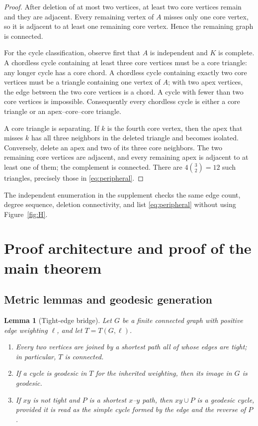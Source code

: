 \documentclass[11pt]{amsart}
\newtheorem{lemma}[theorem]{Lemma}
\theoremstyle{definition}
\begin{document}
\begin{proof}
After deletion of at most two vertices, at least two core vertices remain and they are adjacent.  Every remaining vertex of $A$ misses only one core vertex, so it is adjacent to at least one remaining core vertex.  Hence the remaining graph is connected.

For the cycle classification, observe first that $A$ is independent and $K$ is complete.  A chordless cycle containing at least three core vertices must be a core triangle: any longer cycle has a core chord.  A chordless cycle containing exactly two core vertices must be a triangle containing one vertex of $A$; with two apex vertices, the edge between the two core vertices is a chord.  A cycle with fewer than two core vertices is impossible.  Consequently every chordless cycle is either a core triangle or an apex--core--core triangle.

A core triangle is separating.  If $k$ is the fourth core vertex, then the apex that misses $k$ has all three neighbors in the deleted triangle and becomes isolated.  Conversely, delete an apex and two of its three core neighbors.  The two remaining core vertices are adjacent, and every remaining apex is adjacent to at least one of them; the complement is connected.  There are $4\binom32=12$ such triangles, precisely those in \eqref{eq:peripheral}.
\end{proof}

The independent enumeration in the supplement checks the same edge count, degree sequence, deletion connectivity, and list \eqref{eq:peripheral} without using Figure~\ref{fig:H}.

\section{Proof architecture and proof of the main theorem}\label{sec:proof}

\subsection{Metric lemmas and geodesic generation}

\begin{lemma}[Tight-edge bridge]\label{lem:tightbridge}
Let $G$ be a finite connected graph with positive edge weighting $\ell$, and let $T=T(G,\ell)$.
\begin{enumerate}
\item Every two vertices are joined by a shortest path all of whose edges are tight; in particular, $T$ is connected.
\item If a cycle is geodesic in $T$ for the inherited weighting, then its image in $G$ is geodesic.
\item If $xy$ is not tight and $P$ is a shortest $x$--$y$ path, then $xy\cup P$ is a geodesic cycle, provided it is read as the simple cycle formed by the edge and the reverse of $P$.
\end{enumerate}
\end{lemma}
\end{document}
